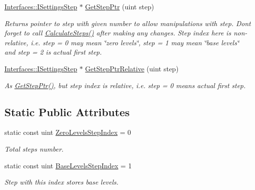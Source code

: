 \begin{DoxyCompactItemize}
\hyperlink{class_interfaces_1_1_i_settings_step}{Interfaces\+::\+I\+Settings\+Step} $\ast$ \hyperlink{class_settings_generator_a37f4175a0ed24853b2f187f15505086b}{Get\+Step\+Ptr} (uint step)
\begin{DoxyCompactList}\small\item\em Returns pointer to step with given number to allow manipulations with step. Don\textquotesingle{}t forget to call \hyperlink{class_settings_generator_a7c9c1a7a3928ba3ce0ad110593b97a96}{Calculate\+Steps()} after making any changes. Step index here is non-\/relative, i.\+e. step = 0 may mean \char`\"{}zero levels\char`\"{}, step = 1 may mean \char`\"{}base levels\char`\"{} and step = 2 is actual first step. \end{DoxyCompactList}\item 
\hyperlink{class_interfaces_1_1_i_settings_step}{Interfaces\+::\+I\+Settings\+Step} $\ast$ \hyperlink{class_settings_generator_aa45d5a3c1349c18ac611ad960ff8470d}{Get\+Step\+Ptr\+Relative} (uint step)
\begin{DoxyCompactList}\small\item\em As \hyperlink{class_settings_generator_a37f4175a0ed24853b2f187f15505086b}{Get\+Step\+Ptr()}, but step index is relative, i.\+e. step = 0 means actual first step. \end{DoxyCompactList}\end{DoxyCompactItemize}
\subsection*{Static Public Attributes}
\begin{DoxyCompactItemize}
\item 
static const uint \hyperlink{class_settings_generator_a45b535223390381aba891c7fa7e7a29f}{Zero\+Levels\+Step\+Index} = 0
\begin{DoxyCompactList}\small\item\em Total steps number. \end{DoxyCompactList}\item 
\mbox{\label{class_settings_generator_aecf7db8691db606782959548c0aa4ff8}} 
static const uint \hyperlink{class_settings_generator_aecf7db8691db606782959548c0aa4ff8}{Base\+Levels\+Step\+Index} = 1
\begin{DoxyCompactList}\small\item\em Step with this index stores base levels. \end{DoxyCompactList}\end{DoxyCompactItemize}


